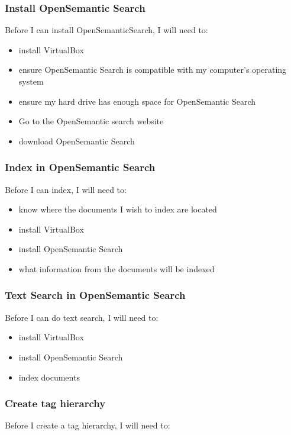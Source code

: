 \documentclass{article}
\begin{document}
\subsubsection*{Install OpenSemantic Search}

Before I can install OpenSemanticSearch, I will need to:\begin{itemize}
\item install VirtualBox
\item ensure OpenSemantic Search is compatible with my computer's operating system
\item ensure my hard drive has enough space for OpenSemantic Search
\item Go to the OpenSemantic search website
\item download OpenSemantic Search
\end{itemize}

\subsubsection*{Index in OpenSemantic Search}

Before I can index, I will need to:\begin{itemize}
\item know where the documents I wish to index are located
\item install VirtualBox
\item install OpenSemantic Search
\item what information from the documents will be indexed
\end{itemize}

\subsubsection*{Text Search in OpenSemantic Search}
Before I can do text search, I will need to:\begin{itemize}
\item install VirtualBox
\item install OpenSemantic Search
\item index documents
\end{itemize}

\subsubsection*{Create tag hierarchy}

Before I create a tag hierarchy, I will need to:
\end{document}
